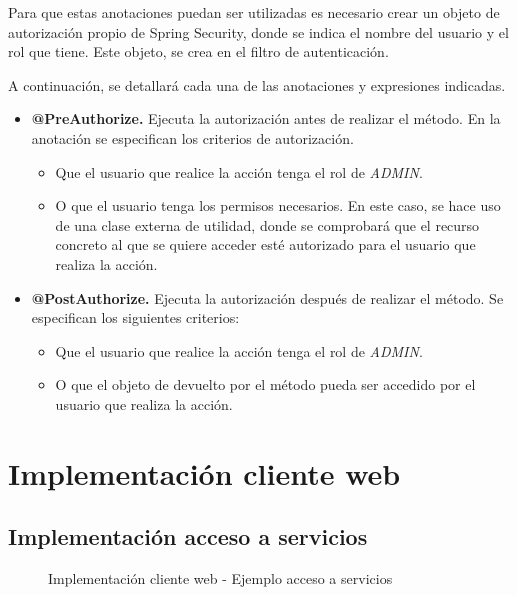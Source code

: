Para que estas anotaciones puedan ser utilizadas es necesario crear un objeto de autorización propio de Spring Security, donde se indica el nombre del usuario y el rol que tiene. Este objeto, se crea en el filtro de autenticación.

A continuación, se detallará cada una de las anotaciones y expresiones indicadas.

\begin{itemize}
	\item \textbf{@PreAuthorize. }Ejecuta la autorización antes de realizar el método. En la anotación se especifican los criterios de autorización.
	\begin{itemize}
		\item Que el usuario que realice la acción tenga el rol de \textit{ADMIN}.
		\item O que el usuario tenga los permisos necesarios. En este caso, se hace uso de una clase externa de utilidad, donde se comprobará que el recurso concreto al que se quiere acceder esté autorizado para el usuario que realiza la acción.
	\end{itemize}	 
		
	\item \textbf{@PostAuthorize. }Ejecuta la autorización después de realizar el método. Se especifican los siguientes criterios:
	\begin{itemize}
		\item Que el usuario que realice la acción tenga el rol de \textit{ADMIN}.
		\item O que el objeto de devuelto por el método pueda ser accedido por el usuario que realiza la acción.
	\end{itemize}
\end{itemize}


\newpage
\section{Implementación cliente web}

\subsection{Implementación acceso a servicios}

\begin{figure}[H]
\centering
{}
\caption{Implementación cliente web - Ejemplo acceso a servicios}
\end{figure}

